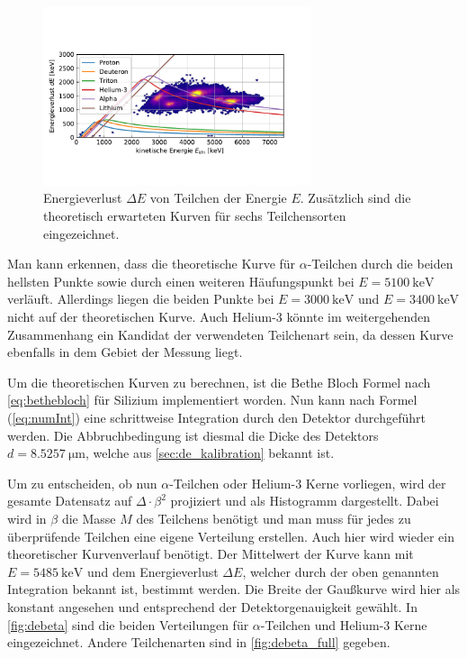 \begin{figure}[ht]
	\centering
	\includegraphics[width=0.7\textwidth]{dat/energieverlust.pdf}
	\caption{Energieverlust $\Delta E$ von Teilchen der Energie $E$. Zusätzlich sind die theoretisch erwarteten Kurven für sechs Teilchensorten eingezeichnet.}
	\label{fig:energieverlust}
\end{figure}

Man kann erkennen, dass die theoretische Kurve für $\alpha$-Teilchen durch die beiden hellsten Punkte sowie durch einen weiteren Häufungspunkt bei $E=\SI{5100}{\kilo\electronvolt}$ verläuft.
Allerdings liegen die beiden Punkte bei $E = \SI{3000}{\kilo\electronvolt}$ und $E=\SI{3400}{\kilo\electronvolt}$ nicht auf der theoretischen Kurve.
Auch Helium-3 könnte im weitergehenden Zusammenhang ein Kandidat der verwendeten Teilchenart sein, da dessen Kurve ebenfalls in dem Gebiet der Messung liegt.

Um die theoretischen Kurven zu berechnen, ist die Bethe Bloch Formel nach \cref{eq:bethebloch} für Silizium implementiert worden.
Nun kann nach Formel (\ref{eq:numInt}) eine schrittweise Integration durch den Detektor durchgeführt werden.
Die Abbruchbedingung ist diesmal die Dicke des Detektors $d = \SI{8.5257}{\micro\meter}$, welche aus \cref{sec:de_kalibration} bekannt ist.

Um zu entscheiden, ob nun $\alpha$-Teilchen oder Helium-3 Kerne vorliegen, wird der gesamte Datensatz auf $\Delta \cdot \beta^2$ projiziert und als Histogramm dargestellt.
Dabei wird in $\beta$ die Masse $M$ des Teilchens benötigt und man muss für jedes zu überprüfende Teilchen eine eigene Verteilung erstellen.
Auch hier wird wieder ein theoretischer Kurvenverlauf benötigt.
Der Mittelwert der Kurve kann mit $E = \SI{5485}{\kilo\electronvolt}$ und dem Energieverlust $\Delta E$, welcher durch der oben genannten Integration bekannt ist, bestimmt werden.
Die Breite der Gaußkurve wird hier als konstant angesehen und entsprechend der Detektorgenauigkeit gewählt.
In \cref{fig:debeta} sind die beiden Verteilungen für $\alpha$-Teilchen und Helium-3 Kerne eingezeichnet.
Andere Teilchenarten sind in \cref{fig:debeta_full} gegeben.

